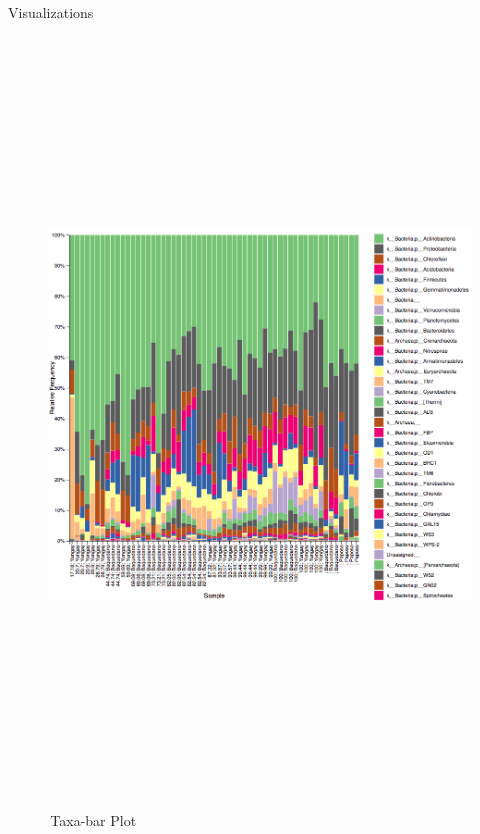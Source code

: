 \documentclass[final]{beamer}
\newlength{\colwidth}
\begin{document}
\begin{frame}[t]
\begin{columns}[t]
\begin{column}{\colwidth}
\begin{block}{Visualizations}
    \begin{figure}[tph!]
      {\includegraphics[height=20cm]{assets/taxabar-plot}}
      \caption{\,Taxa-bar Plot }
      \label{fig:taxabar-plot}
    \end{figure}


\end{block}
\end{column}
\end{columns}
\end{frame}
\end{document}
